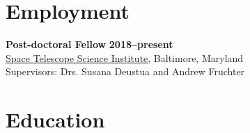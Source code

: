 \documentclass[margin]{res}
\begin{document}
\begin{resume}

\section{Employment} 


{\bf Post-doctoral Fellow} \hfill {\bf 2018--present}\\
\href{http://physics.nd.edu}{Space Telescope Science Institute}, Baltimore, Maryland\\ 
Supervisors: Drs. Susana Deustua and Andrew Fruchter




 




\section{Education}


\end{resume}
\end{document}
